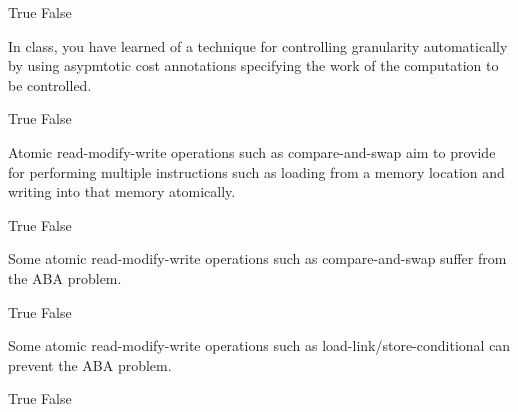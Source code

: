 \begin{cluster}
\begin{parts}
\begin{problem}[2]
\begin{pickone}
\correctchoice True
\choice False
\end{pickone}

\end{problem}

\begin{problem}[2]

In class, you have learned of a technique for controlling granularity
automatically by using asypmtotic cost annotations specifying the work
of the  computation to be controlled.

\begin{pickone}
\choice True
\correctchoice False
\end{pickone}

\end{problem}

\begin{problem}[2]

Atomic read-modify-write operations such as compare-and-swap aim to
provide for performing multiple instructions such as loading from a
memory location and writing into that memory atomically.

\begin{pickone}
\correctchoice True
\choice False
\end{pickone}


\end{problem} 


\begin{problem}[2]

Some atomic read-modify-write operations such as compare-and-swap
suffer from the ABA problem.

\begin{pickone}
\correctchoice True
\choice False
\end{pickone}


\end{problem} 

\begin{problem}[2]

Some atomic read-modify-write operations such as
load-link/store-conditional can prevent the ABA problem.

\begin{pickone}
\correctchoice True
\choice False
\end{pickone}
\end{problem}




\end{parts}
\end{cluster}

